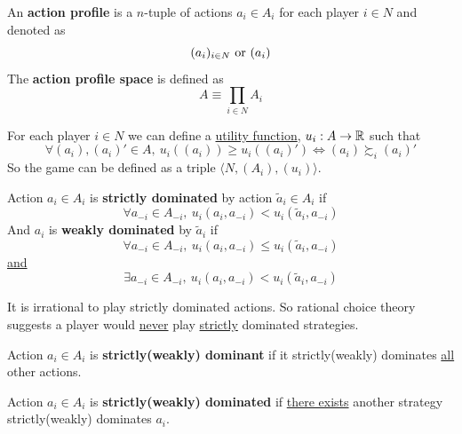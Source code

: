\documentclass[11pt]{article}
\begin{document}
		\begin{definition}
			An \textbf{action profile} is a $n$-tuple of actions $a_i \in A_i$ for each player $i \in N$ and denoted as 
				\[
					(a_i)_{i \in N} \text{{ or }} (a_i)
				\]
			The \textbf{action profile space} is defined as 
				\[
					A \equiv \prod_{i \in N} A_i
				\]
		\end{definition}
		
		\begin{definition}
			For each player $i \in N$ we can define a \ul{utility function}, $u_i: A \to \mathbb{R}$ such that
			\begin{equation}
				\forall (a_i), (a_i)' \in A,\ u_i((a_i)) \geq u_i((a_i)') \iff (a_i) \succsim_i (a_i)'
			\end{equation}
			So the game can be defined as a triple $\langle N, (A_i), (u_i) \rangle$.
		\end{definition}
		
		\begin{definition}
			Action $a_i \in A_i$ is \textbf{strictly dominated} by action $\tilde{a}_i \in A_i$ if
			\[
				\forall a_{-i} \in A_{-i},\ u_i(a_i, a_{-i}) < u_i(\tilde{a}_i, a_{-i})
			\]
			And $a_i$ is \textbf{weakly dominated} by $\tilde{a}_i$ if
			\[
				\forall a_{-i} \in A_{-i},\ u_i(a_i, a_{-i}) \leq u_i(\tilde{a}_i, a_{-i})
			\]
			\ul{and}
			\[
				\exists a_{-i} \in A_{-i},\ u_i(a_i, a_{-i}) < u_i(\tilde{a}_i, a_{-i})
			\]
		\end{definition}
		
		\begin{corollary}
			It is irrational to play strictly dominated actions. So rational choice theory suggests a player would \ul{never} play \ul{strictly} dominated strategies.
		\end{corollary}
		
		\begin{definition}
			Action $a_i \in A_i$ is \textbf{strictly(weakly) dominant} if it strictly(weakly) dominates \ul{all} other actions.
		\end{definition}
		
		\begin{definition}
			Action $a_i \in A_i$ is \textbf{strictly(weakly) dominated} if \ul{there exists} another strategy strictly(weakly) dominates $a_i$.
		\end{definition}
		
\end{document}
